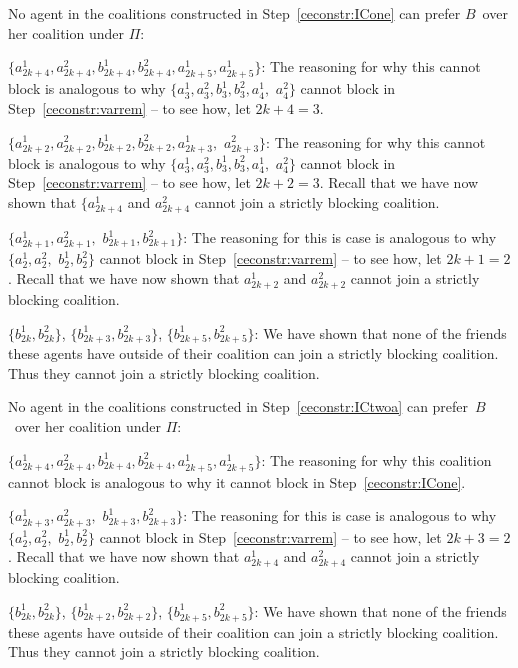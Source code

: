 \documentclass[a4paper,fleqn]{cas-sc}
\newcommand{\partition}{\ensuremath{\Pi}\xspace}
\newcommand{\blockingCoalition}{\ensuremath{B}\xspace}
\begin{document}
{No agent in the coalitions constructed in Step~\eqref{ceconstr:ICone} can prefer \blockingCoalition\ over her coalition under \partition:
\begin{compactitem}
\item $\{a^1_{2k + 4}, a^2_{2k + 4}, b^1_{2k + 4}, b^2_{2k + 4}, a^1_{2k + 5}, a^1_{2k + 5}\}$: The reasoning for why this cannot block is analogous to why $\{a^1_3, a^2_3, b^1_3, b^2_3, a^1_4,$ $a^2_4\}$ cannot block in Step~\eqref{ceconstr:varrem} -- to see how, let $2k + 4 = 3$.
\item $\{a^1_{2k + 2}, a^2_{2k + 2}, b^1_{2k + 2}, b^2_{2k + 2}, a^1_{2k + 3},$ $ a^2_{2k + 3}\}$: The reasoning for why this cannot block is analogous to why  $\{a^1_3, a^2_3, b^1_3, b^2_3, a^1_4,$ $a^2_4\}$ cannot block in Step~\eqref{ceconstr:varrem} -- to see how, let $2k + 2 = 3$.  Recall that we have now shown that $\{a^1_{2k + 4}$ and $a^2_{2k + 4}$ cannot join a strictly blocking coalition.
\item $\{a^1_{2k + 1}, a^2_{2k + 1},$ $b^1_{2k + 1}, b^2_{2k + 1}\}$: The reasoning for this is case is analogous to why $\{a^1_{2}, a^2_{2},$ $b^1_{2}, b^2_{2}\}$ cannot block in Step~\eqref{ceconstr:varrem} -- to see how, let $2k + 1 = 2$. Recall that we have now shown that $a^1_{2k + 2}$ and $a^2_{2k + 2}$ cannot join a strictly blocking coalition.
\item $\{b^1_{2k}, b^2_{2k}\}$, $\{b^1_{2k + 3}, b^2_{2k + 3}\}$, $\{b^1_{2k + 5}, b^2_{2k + 5}\}$: We have shown that none of the friends these agents have outside of their coalition can join a strictly blocking coalition. Thus they cannot join a strictly blocking coalition.
\end{compactitem}

No agent in the coalitions constructed in Step~\eqref{ceconstr:ICtwoa} can prefer~\blockingCoalition\ over her coalition under \partition:
\begin{compactitem}
\item $\{a^1_{2k + 4}, a^2_{2k + 4}, b^1_{2k + 4}, b^2_{2k + 4}, a^1_{2k + 5}, a^1_{2k + 5}\}$: The reasoning for why this coalition cannot block is analogous to why it cannot block in Step~\eqref{ceconstr:ICone}.
\item $\{a^1_{2k + 3}, a^2_{2k + 3},$ $b^1_{2k + 3}, b^2_{2k + 3}\}$: The reasoning for this is case is analogous to why $\{a^1_{2}, a^2_{2},$ $b^1_{2}, b^2_{2}\}$ cannot block in Step~\eqref{ceconstr:varrem} -- to see how, let $2k + 3 = 2$. Recall that we have now shown that $a^1_{2k + 4}$ and $a^2_{2k + 4}$ cannot join a strictly blocking coalition.
\item $\{b^1_{2k}, b^2_{2k}\}$, $\{b^1_{2k + 2}, b^2_{2k + 2}\}$, $\{b^1_{2k + 5}, b^2_{2k + 5}\}$: We have shown that none of the friends these agents have outside of their coalition can join a strictly blocking coalition. Thus they cannot join a strictly blocking coalition.
\end{compactitem}

}
\end{document}
